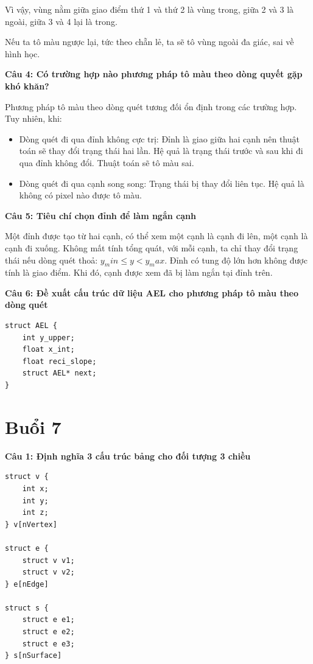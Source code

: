 Vì vậy, vùng nằm giữa giao điểm thứ 1 và thứ 2 là vùng trong,
giữa 2 và 3 là ngoài, giữa 3 và 4 lại là trong.

Nếu ta tô màu ngược lại, tức theo chẵn lẻ, ta sẽ tô vùng ngoài đa giác, sai về hình học.

\textbf{Câu 4: Có trường hợp nào phương pháp tô màu theo dòng quyết gặp khó khăn?}

Phương pháp tô màu theo dòng quét tương đối ổn định trong các trường hợp. Tuy nhiên, khi:

\begin{itemize}
	\item Dòng quét đi qua đỉnh không cực trị: Đỉnh là giao giữa hai cạnh nên thuật toán sẽ thay đổi trạng thái hai lần. Hệ quả là trạng thái trước và sau khi đi qua đỉnh không đổi. Thuật toán sẽ tô màu sai.
	
	\item Dòng quét đi qua cạnh song song: Trạng thái bị thay đổi liên tục. Hệ quả là không có pixel nào được tô màu.
\end{itemize}

\textbf{Câu 5: Tiêu chí chọn đỉnh để làm ngắn cạnh}

Một đỉnh được tạo từ hai cạnh, có thể xem một cạnh là cạnh đi lên, một cạnh là cạnh đi xuống. Không mất tính tổng quát, với mỗi cạnh, ta chỉ thay đổi trạng thái nếu dòng quét thoả: $y_min \le y < y_max$. Đỉnh có tung độ lớn hơn không được tính là giao điểm. Khi đó, cạnh được xem đã bị làm ngắn tại đỉnh trên.

\textbf{Câu 6: Đề xuất cấu trúc dữ liệu AEL cho phương pháp tô màu theo dòng quét}

\begin{lstlisting}
struct AEL {
	int y_upper;
	float x_int;
	float reci_slope;
	struct AEL* next;
}
\end{lstlisting}

\section{Buổi 7}

\textbf{Câu 1: Định nghĩa 3 cấu trúc bảng cho đối tượng 3 chiều}

\begin{lstlisting}
struct v {
	int x;
	int y;
	int z;
} v[nVertex]

struct e {
	struct v v1;
	struct v v2;
} e[nEdge]

struct s {
	struct e e1;
	struct e e2;
	struct e e3;
} s[nSurface]
\end{lstlisting}

